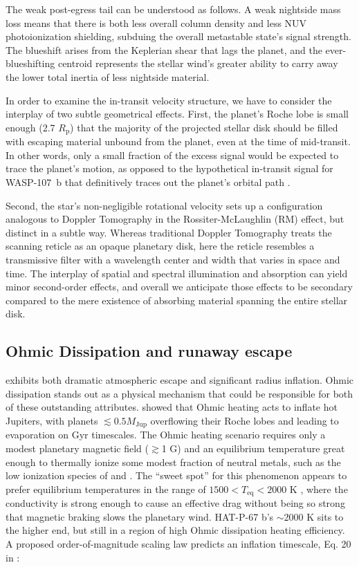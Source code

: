 \documentclass[twocolumn]{aastex631}
\begin{document}
The weak post-egress tail can be understood as follows.  A weak nightside mass loss means that there is both less overall column density and less NUV photoionization shielding, subduing the overall  metastable state's signal strength.  The blueshift arises from the Keplerian shear that lags the planet, and the ever-blueshifting centroid represents the stellar wind's greater ability to carry away the lower total inertia of less nightside material.

In order to examine the in-transit velocity structure, we have to consider the interplay of two subtle geometrical effects.  First, the planet's Roche lobe is small enough (2.7 $R_\mathrm{p}$) that the majority of the projected stellar disk should be filled with escaping material unbound from the planet, even at the time of mid-transit.  In other words, only a small fraction of the  excess signal would be expected to trace the planet's motion, as opposed to the hypothetical in-transit signal for WASP-107~b that definitively traces out the planet's orbital path \citep{2022ApJ...926..226M}.

Second, the star's non-negligible rotational velocity sets up a configuration analogous to Doppler Tomography in the Rossiter-McLaughlin (RM) effect, but distinct in a subtle way.  Whereas traditional Doppler Tomography treats the scanning reticle as an opaque planetary disk, here the reticle resembles a transmissive filter with a wavelength center and width that varies in space and time.  The interplay of spatial and spectral illumination and absorption can yield minor second-order effects, and overall we anticipate those effects to be secondary compared to the mere existence of absorbing material spanning the entire stellar disk.

\subsection{Ohmic Dissipation and runaway escape}
 exhibits both dramatic atmospheric escape and significant radius inflation.  Ohmic dissipation stands out as a physical mechanism that could be responsible for both of these outstanding attributes.  \citet{2011ApJ...738....1B} showed that Ohmic heating acts to inflate hot Jupiters, with planets $\lesssim 0.5 M_\mathrm{Jup}$ overflowing their Roche lobes and leading to evaporation on Gyr timescales.  The Ohmic heating scenario requires only a modest planetary magnetic field ($\gtrsim$1 G) and an equilibrium temperature great enough to thermally ionize some modest fraction of neutral metals, such as the low ionization species of  and .  The ``sweet spot'' for this phenomenon appears to prefer equilibrium temperatures in the range of $1500<T_\mathrm{eq}<2000$ K \citep{2011ApJ...738....1B,2012ApJ...745..138M,2016ApJ...819..116G,2018AJ....155..214T,2022A&A...658L...7K}, where the conductivity is strong enough to cause an effective drag without being so strong that magnetic braking slows the planetary wind.  HAT-P-67 b's $\sim$2000 K sits to the higher end, but still in a region of high Ohmic dissipation heating efficiency.  A proposed order-of-magnitude scaling law predicts an inflation timescale, Eq. 20 in \citet{2011ApJ...738....1B}:
\end{document}
